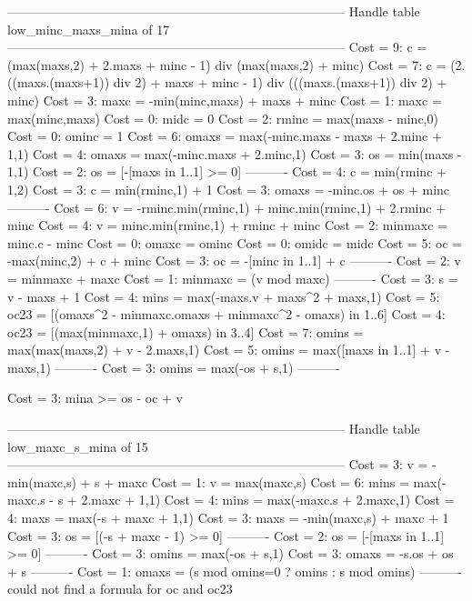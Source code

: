 --------------------------------------------------------------------------------
Handle table low_minc_maxs_mina of 17
--------------------------------------------------------------------------------
Cost =  9:  c       = (max(maxs,2) + 2.maxs + minc - 1) div (max(maxs,2) + minc)
Cost =  7:  c       = (2.((maxs.(maxs+1)) div 2) + maxs + minc - 1) div (((maxs.(maxs+1)) div 2) + minc)
Cost =  3:  maxc    = -min(minc,maxs) + maxs + minc
Cost =  1:  maxc    = max(minc,maxs)
Cost =  0:  midc    = 0
Cost =  2:  rminc   = max(maxs - minc,0)
Cost =  0:  ominc   = 1
Cost =  6:  omaxs   = max(-minc.maxs - maxs + 2.minc + 1,1)
Cost =  4:  omaxs   = max(-minc.maxs + 2.minc,1)
Cost =  3:  os      = min(maxs - 1,1)
Cost =  2:  os      = [-[maxs in 1..1] >= 0]
----------
Cost =  4:  c       = min(rminc + 1,2)
Cost =  3:  c       = min(rminc,1) + 1
Cost =  3:  omaxs   = -minc.os + os + minc
----------
Cost =  6:  v       = -rminc.min(rminc,1) + minc.min(rminc,1) + 2.rminc + minc
Cost =  4:  v       = minc.min(rminc,1) + rminc + minc
Cost =  2:  minmaxc = minc.c - minc
Cost =  0:  omaxc   = ominc
Cost =  0:  omidc   = midc
Cost =  5:  oc      = -max(minc,2) + c + minc
Cost =  3:  oc      = -[minc in 1..1] + c
----------
Cost =  2:  v       = minmaxc + maxc
Cost =  1:  minmaxc = (v mod maxc)
----------
Cost =  3:  s       = v - maxs + 1
Cost =  4:  mins    = max(-maxs.v + maxs^2 + maxs,1)
Cost =  5:  oc23    = [(omaxs^2 - minmaxc.omaxs + minmaxc^2 - omaxs) in 1..6]
Cost =  4:  oc23    = [(max(minmaxc,1) + omaxs) in 3..4]
Cost =  7:  omins   = max(max(maxs,2) + v - 2.maxs,1)
Cost =  5:  omins   = max([maxs in 1..1] + v - maxs,1)
----------
Cost =  3:  omins   = max(-os + s,1)
----------

Cost =  3:  mina >= os - oc + v

--------------------------------------------------------------------------------
Handle table low_maxc_s_mina of 15
--------------------------------------------------------------------------------
Cost =  3:  v     = -min(maxc,s) + s + maxc
Cost =  1:  v     = max(maxc,s)
Cost =  6:  mins  = max(-maxc.s - s + 2.maxc + 1,1)
Cost =  4:  mins  = max(-maxc.s + 2.maxc,1)
Cost =  4:  maxs  = max(-s + maxc + 1,1)
Cost =  3:  maxs  = -min(maxc,s) + maxc + 1
Cost =  3:  os    = [(-s + maxc - 1) >= 0]
----------
Cost =  2:  os    = [-[maxs in 1..1] >= 0]
----------
Cost =  3:  omins = max(-os + s,1)
Cost =  3:  omaxs = -s.os + os + s
----------
Cost =  1:  omaxs = (s mod omins=0 ? omins : s mod omins)
----------
could not find a formula for oc and oc23

